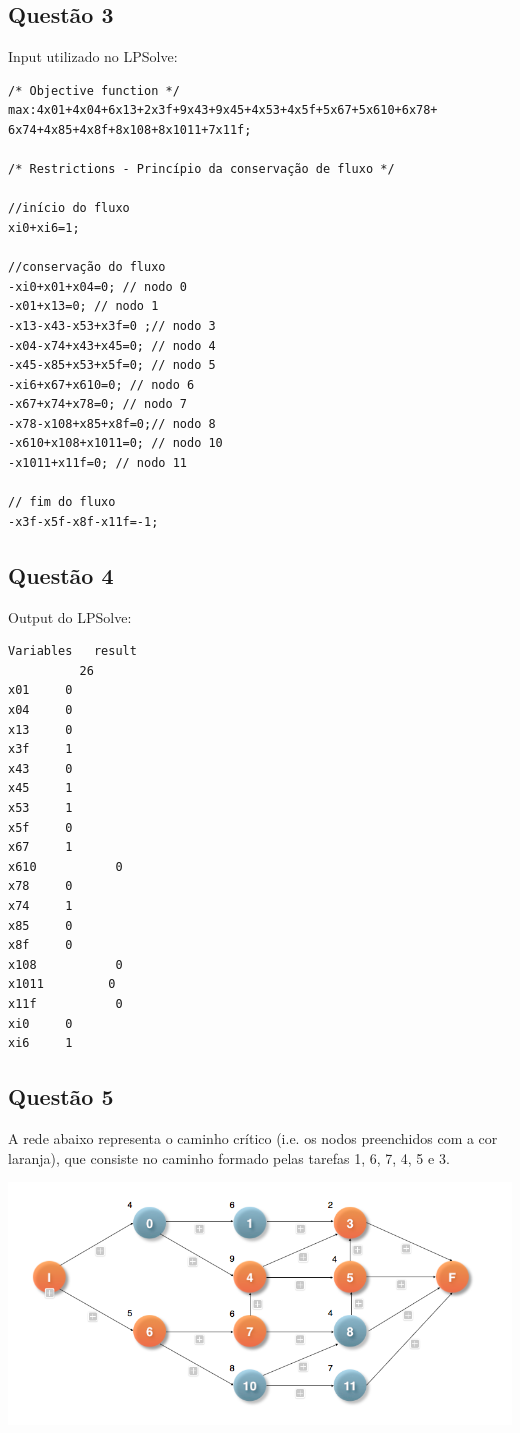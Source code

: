 \documentclass[11pt,titlepage,contentspage,a4paper]{article} %
\begin{document}
\subsection{Questão 3}
Input utilizado no LPSolve:
\begin{Verbatim}[frame=single]
/* Objective function */
max:4x01+4x04+6x13+2x3f+9x43+9x45+4x53+4x5f+5x67+5x610+6x78+
6x74+4x85+4x8f+8x108+8x1011+7x11f;

/* Restrictions - Princípio da conservação de fluxo */

//início do fluxo
xi0+xi6=1;

//conservação do fluxo
-xi0+x01+x04=0; // nodo 0
-x01+x13=0; // nodo 1
-x13-x43-x53+x3f=0 ;// nodo 3
-x04-x74+x43+x45=0; // nodo 4
-x45-x85+x53+x5f=0; // nodo 5
-xi6+x67+x610=0; // nodo 6
-x67+x74+x78=0; // nodo 7
-x78-x108+x85+x8f=0;// nodo 8
-x610+x108+x1011=0; // nodo 10
-x1011+x11f=0; // nodo 11

// fim do fluxo
-x3f-x5f-x8f-x11f=-1;

\end{Verbatim}
\subsection{Questão 4}
Output do LPSolve:
\begin{Verbatim}[frame=single]
Variables	result
		  26
x01		0
x04		0
x13		0
x3f		1
x43		0
x45		1
x53		1
x5f		0
x67		1
x610	       0
x78		0
x74		1
x85		0
x8f		0
x108	       0
x1011	      0
x11f	       0
xi0		0
xi6		1
\end{Verbatim}

\subsection{Questão 5}
A rede abaixo representa o caminho crítico (i.e. os nodos preenchidos com a cor laranja), que consiste no caminho formado pelas tarefas 1, 6, 7, 4, 5 e 3.

\begin{center}
\includegraphics[width=\textwidth]{grafocritico}
\end{center}
\end{document}
